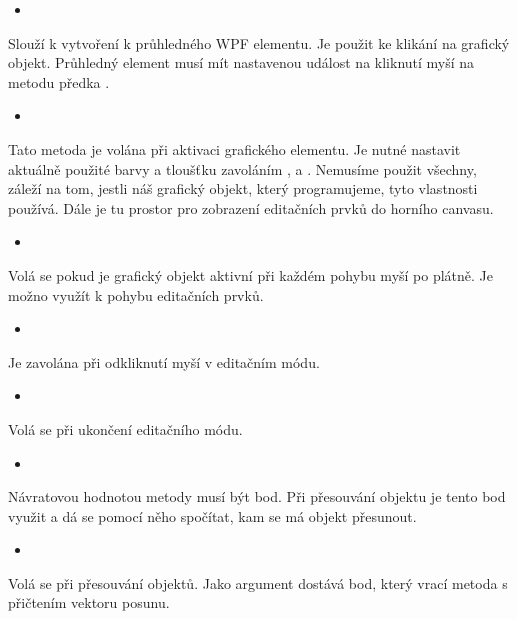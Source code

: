 \documentclass[
  field=inf,
  biblatex=false,
  glossaries,
  index
]{kidiplom}
\begin{document}
\begin{itemize}
\item {}
\end{itemize}
Slouží k vytvoření k průhledného WPF elementu. Je použit ke klikání na grafický objekt. Průhledný element musí mít nastavenou událost na kliknutí myší na metodu předka .

\begin{itemize}
\item {}
\end{itemize}
Tato metoda je volána při aktivaci grafického elementu. Je nutné nastavit aktuálně použité barvy a tloušťku zavoláním ,  a . Nemusíme použit všechny, záleží na tom, jestli náš grafický objekt, který programujeme, tyto vlastnosti používá.
Dále je tu prostor pro zobrazení editačních prvků do horního canvasu.

\begin{itemize}
\item {}
\end{itemize}
Volá se pokud je grafický objekt aktivní při každém pohybu myší po plátně. Je možno využít k pohybu editačních prvků.

\begin{itemize}
\item {}
\end{itemize}
Je zavolána při odkliknutí myší v editačním módu.

\begin{itemize}
\item {}
\end{itemize}
Volá se při ukončení editačního módu.

\begin{itemize}
\item {}
\end{itemize}
Návratovou hodnotou metody musí být bod. Při přesouvání objektu je tento bod využit a dá se pomocí něho spočítat, kam se má objekt přesunout.

\begin{itemize}
\item {}
\end{itemize}
Volá se při přesouvání objektů. Jako argument dostává bod, který vrací metoda  s přičtením vektoru posunu.
\end{document}
